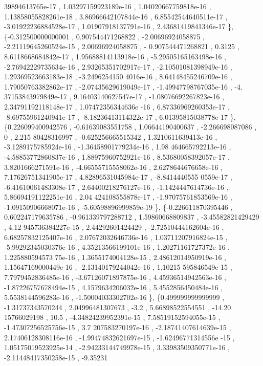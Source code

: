 \begin{DoxyCode}
      39894613765e-17 , 1.03297159923189e-16 , 1.04020667759818e-16 , 1.13858055828261e-18 , 3.86966642107844e-16 
      , 6.85542544640511e-17 , -3.01922236884528e-17 , 1.01907918137791e-16 , 2.43681419841346e-17 \},
\{-0.312500000000001 , 0.907544471268822 , -2.00696924058875 , -2.21119645260524e-15 ,  2.00696924058875 , -
      0.907544471268821 ,            0.3125 , 8.6118668684842e-17 , 1.95688814113918e-16 , -5.29505165163498e-16 ,
       -2.76942229735634e-16 , 2.93265351702917e-17 , -2.10501081398949e-16 , 1.29369523663183e-18 , -3.2496254150
      4016e-16 , 8.64148455246709e-16 , 1.79050763382862e-17 , -2.07435629619049e-17 , -1.49947798767035e-16 , -4.
      37153843979849e-17 , 9.16403140627547e-17 , -1.08076692267823e-16 , 2.34791192118148e-17 , 1.07472356344636e
      -16 , 6.87336969260353e-17 , -8.69755961240941e-17 , -8.18236413114322e-17 , 6.01395815038778e-17 \},
\{0.226099400942576 , -0.61639083551758 ,  1.06644190400637 ,   -2.266698087086 ,                 0 ,  2.215
      80428316997 , -0.625256665515342 , 1.3210611639413e-16 , -3.1289175785924e-16 , -1.36458901779234e-16 , 1.98
      464665792213e-16 , -4.58853772860837e-16 , 1.88975960752921e-16 , 8.53680058392057e-17 , 3.8201666271591e-16
       , -4.66555715558062e-16 , 2.6278644676658e-16 , 7.17626751341905e-17 , 4.82896531045984e-17 , -8.8414440555
      0559e-17 , -6.41610061483308e-17 , 2.64400218276127e-16 , -1.1424447614736e-16 , 5.86694191122251e-16 , 2.04
      424108555878e-17 , -1.97075761853569e-16 , -1.09150906668071e-16 , -5.60598896999859e-19 \},
\{-0.226611870395446 , 0.602247179635786 , -0.961339797288712 ,  1.59860668809837 , -3.45582821429429 , 4.12
      945736384227e-15 ,  2.44292601424429 , -2.72510444162604e-16 , 6.68257832125407e-16 , 2.07672032646736e-16 ,
       1.03711207916824e-15 , -5.99292345030376e-16 , 4.35213566199101e-16 , 1.20271161727372e-16 , 1.225880594573
      75e-16 , 1.3655174004128e-15 , 2.48612014950919e-16 , 1.15647169000449e-16 , -2.13140179244042e-16 , 1.10215
      595846549e-15 , 7.7979452836485e-16 , -3.67126071897875e-16 , 4.45936514942563e-16 , -1.87226757678494e-15 ,
       4.1579634206032e-16 , 5.4552856450484e-16 , 5.5538144596283e-16 , -1.50004033302702e-16 \},
\{0.499999999999999 , -1.31737343570244 ,  2.04996481307673 ,              -3.2 ,  5.66898522554551 , -14.20
      15766029198 ,              10.5 , -4.34824239952391e-15 , 7.58519152594055e-15 , -1.47307256525756e-15 , 3.7
      207583270197e-16 , -2.18741407614639e-15 , 2.17406128308116e-16 , -1.99474832621697e-15 , -1.62496771314556e
      -15 , 1.05175019523925e-14 , -2.94233144749978e-15 , 3.33983509350771e-16 , -2.11448417350258e-15 , -9.35231

\end{DoxyCode}
